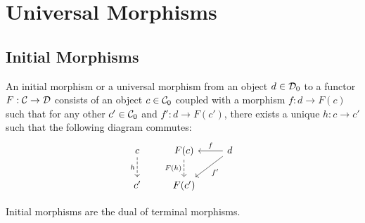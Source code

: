 \section{Universal Morphisms}

\subsection{Initial Morphisms}

\begin{definition}
	An initial morphism or a universal morphism from an object $d\in \mathcal{D}_0$ to a
	functor $F:\mathcal{C}\to \mathcal{D}$ consists of an object $c\in \mathcal{C}_0$ coupled with a morphism
	$f: d\to F(c)$ such that for any other $c'\in \mathcal{C}_0$ and $f': d \to F(c')$,
	there exists a unique $h:c\to c'$ such that the following diagram commutes:
	\[\begin{tikzcd}[ampersand replacement=\&]
		c \& {F(c)} \& d \\
		{c'} \& {F(c')}
		\arrow["h"', dashed, from=1-1, to=2-1]
		\arrow["{F(h)}"', dashed, from=1-2, to=2-2]
		\arrow["{f'}", from=1-3, to=2-2]
		\arrow["f"', from=1-3, to=1-2]
	\end{tikzcd}\]
\end{definition}

\begin{remark}
	Initial morphisms are the dual of terminal morphisms.
\end{remark}


